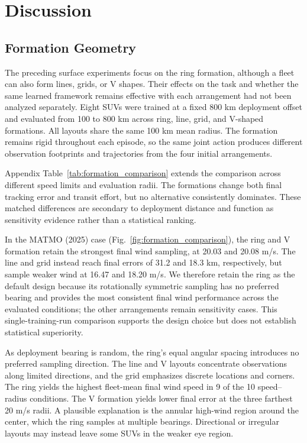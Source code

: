 \documentclass[a4paper,fleqn]{cas-dc}
\begin{document}
\section{Discussion}
\label{sec:discussion}

\subsection{Formation Geometry}
\label{subsec:formation_comparison}

The preceding surface experiments focus on the ring formation, although a fleet
can also form lines, grids, or V shapes. Their effects on the task and
whether the same learned framework remains effective with each arrangement had
not been analyzed separately. Eight SUVs were trained at a fixed 800 km
deployment offset and evaluated from 100 to 800 km across ring, line, grid, and
V-shaped formations. All layouts share the same 100 km mean radius.
The formation remains rigid throughout each episode, so the same joint action
produces different observation footprints and trajectories from the four
initial arrangements.

Appendix Table~\ref{tab:formation_comparison} extends the comparison across
different speed limits and evaluation radii. The formations change both final
tracking error and transit effort, but no alternative consistently dominates.
These matched differences are secondary to deployment distance and function as
sensitivity evidence rather than a statistical ranking.

In the MATMO (2025) case
(Fig.~\ref{fig:formation_comparison}), the ring and V formation retain the
strongest final wind sampling, at 20.03 and 20.08 m/s. The line and grid instead
reach final errors of 31.2 and 18.3 km, respectively, but sample weaker wind at
16.47 and 18.20 m/s. We therefore retain the ring as the default design because
its rotationally symmetric sampling has no preferred bearing and provides the most
consistent final wind performance across the evaluated conditions; the other
arrangements remain sensitivity cases. This single-training-run comparison
supports the design choice but does not establish statistical superiority.

As deployment bearing is random, the ring's equal angular spacing introduces no
preferred sampling direction. The line and V layouts concentrate observations
along limited directions, and the grid emphasizes discrete locations and
corners. The ring yields the highest fleet-mean final wind speed in 9 of the 10
speed--radius conditions. The V formation yields lower final error at the three
farthest 20 m/s radii. A plausible explanation is the annular high-wind region
around the center, which the ring samples at multiple bearings. Directional or
irregular layouts may instead leave some SUVs in the weaker eye region.
\end{document}

